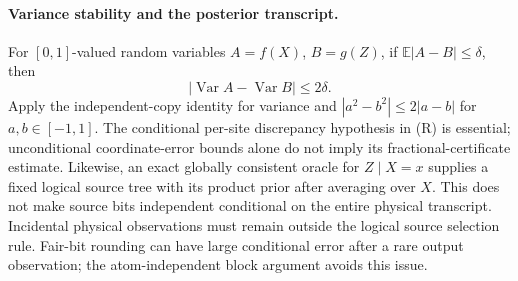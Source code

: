 \paragraph{Variance stability and the posterior transcript.}
For \([0,1]\)-valued random variables \(A=f(X)\), \(B=g(Z)\), if
\(\mathbb E|A-B|\le\delta\), then
\[
 |\operatorname{Var}A-\operatorname{Var}B|\le2\delta.
\]
Apply the independent-copy identity for variance and
\(|a^2-b^2|\le2|a-b|\) for \(a,b\in[-1,1]\).
The conditional per-site discrepancy hypothesis in (R) is essential;
unconditional coordinate-error bounds alone do not imply its
fractional-certificate estimate. Likewise, an exact globally consistent
oracle for \(Z\mid X=x\) supplies a fixed logical source tree with its
product prior after averaging over \(X\). This does not make source bits
independent conditional on the entire physical transcript. Incidental
physical observations must remain outside the logical source selection
rule. Fair-bit rounding can have large conditional error after a rare
output observation; the atom-independent block argument avoids this issue.

